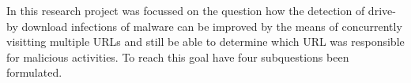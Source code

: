 

In this research project was focussed on the question how the detection of drive-by download infections of malware can be improved by the means of concurrently visitting multiple URLs and still be able to determine which URL was responsible for malicious activities. To reach this goal have four subquestions been formulated.

